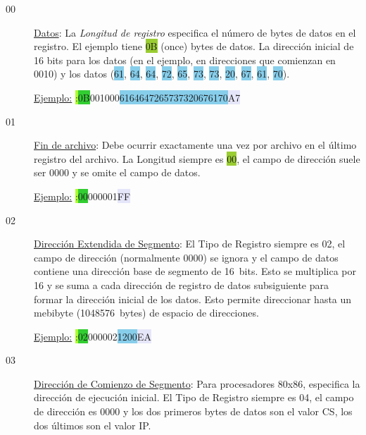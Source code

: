 \begin{description}
    \item[00] \underline{Datos}: La \textit{Longitud de registro} especifica el número de bytes de datos en el registro. El ejemplo tiene \colorbox{YellowGreen}{0B} (once) bytes de datos. La dirección inicial de 16 bits para los datos (en el ejemplo, en direcciones que comienzan en \colorbox{Periwinkle}{0010}) y los datos (\colorbox{SkyBlue}{61}, \colorbox{SkyBlue}{64}, \colorbox{SkyBlue}{64}, \colorbox{SkyBlue}{72}, \colorbox{SkyBlue}{65}, \colorbox{SkyBlue}{73}, \colorbox{SkyBlue}{73}, \colorbox{SkyBlue}{20}, \colorbox{SkyBlue}{67}, \colorbox{SkyBlue}{61}, \colorbox{SkyBlue}{70}).
    
    \underline{Ejemplo:} \colorbox{GreenYellow}{:}\colorbox{LimeGreen}{0B}\colorbox{Periwinkle}{0010}\colorbox{Peach}{00}\colorbox{SkyBlue}{6164647265737320676170}\colorbox{Lavender}{A7}
    
    \item[01] \underline{Fin de archivo}: Debe ocurrir exactamente una vez por archivo en el último registro del archivo. La Longitud siempre es \colorbox{YellowGreen}{00}, el campo de dirección suele ser \colorbox{Periwinkle}{0000} y se omite el campo de datos.
    
    \underline{Ejemplo:} \colorbox{GreenYellow}{:}\colorbox{LimeGreen}{00}\colorbox{Periwinkle}{0000}\colorbox{Peach}{01}\colorbox{Lavender}{FF}
    
    \item[02] \underline{Dirección Extendida de Segmento}: El Tipo de Registro siempre es \colorbox{Peach}{02}, el campo de dirección (normalmente \colorbox{Periwinkle}{0000}) se ignora y el campo de datos contiene una dirección base de segmento de 16~bits. Esto se multiplica por 16 y se suma a cada dirección de registro de datos subsiguiente para formar la dirección inicial de los datos. Esto permite direccionar hasta un mebibyte (1048576~bytes) de espacio de direcciones.

    \underline{Ejemplo:} \colorbox{GreenYellow}{:}\colorbox{LimeGreen}{02}\colorbox{Periwinkle}{0000}\colorbox{Peach}{02}\colorbox{SkyBlue}{1200}\colorbox{Lavender}{EA}
    
    \item[03] \underline{Dirección de Comienzo de Segmento}: Para procesadores 80x86, especifica la dirección de ejecución inicial. El Tipo de Registro siempre es \colorbox{Peach}{04}, el campo de dirección es \colorbox{Periwinkle}{0000} y los dos primeros bytes de datos son el valor CS, los dos últimos son el valor IP.
    

\end{description}
